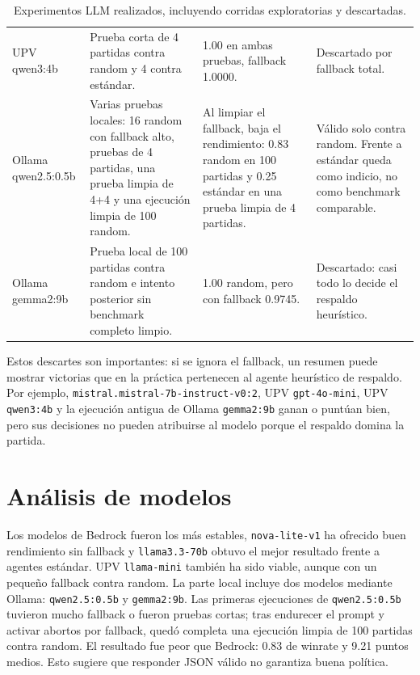 ﻿\documentclass[10pt,a4paper]{article}
\begin{document}
\begin{table}[H]
\begin{tabular}{L{2.7cm}L{4.3cm}L{4.6cm}L{4.4cm}}
\addlinespace[0.25em]
UPV qwen3:4b & Prueba corta de 4 partidas contra random y 4 contra estándar. & 1.00 en ambas pruebas, fallback 1.0000. & Descartado por fallback total. \\
\addlinespace[0.25em]
Ollama qwen2.5:0.5b & Varias pruebas locales: 16 random con fallback alto, pruebas de 4 partidas, una prueba limpia de 4+4 y una ejecución limpia de 100 random. & Al limpiar el fallback, baja el rendimiento: 0.83 random en 100 partidas y 0.25 estándar en una prueba limpia de 4 partidas. & Válido solo contra random. Frente a estándar queda como indicio, no como benchmark comparable. \\
\addlinespace[0.25em]
Ollama gemma2:9b & Prueba local de 100 partidas contra random e intento posterior sin benchmark completo limpio. & 1.00 random, pero con fallback 0.9745. & Descartado: casi todo lo decide el respaldo heurístico. \\
\bottomrule
\end{tabular}
\caption{Experimentos LLM realizados, incluyendo corridas exploratorias y descartadas.}
\label{tab:llm_all}
\end{table}

Estos descartes son importantes: si se ignora el fallback, un resumen puede mostrar victorias que en la práctica pertenecen al agente heurístico de respaldo. Por ejemplo, \texttt{mistral.mistral-7b-instruct-v0:2}, UPV \texttt{gpt-4o-mini}, UPV \texttt{qwen3:4b} y la ejecución antigua de Ollama \texttt{gemma2:9b} ganan o puntúan bien, pero sus decisiones no pueden atribuirse al modelo porque el respaldo domina la partida.

\section{Análisis de modelos}
Los modelos de Bedrock fueron los más estables, \texttt{nova-lite-v1} ha ofrecido buen rendimiento sin fallback y \texttt{llama3.3-70b} obtuvo el mejor resultado frente a agentes estándar. UPV \texttt{llama-mini} también ha sido viable, aunque con un pequeño fallback contra random. La parte local incluye dos modelos mediante Ollama: \texttt{qwen2.5:0.5b} y \texttt{gemma2:9b}. Las primeras ejecuciones de \texttt{qwen2.5:0.5b} tuvieron mucho fallback o fueron pruebas cortas; tras endurecer el prompt y activar abortos por fallback, quedó completa una ejecución limpia de 100 partidas contra random. El resultado fue peor que Bedrock: 0.83 de winrate y 9.21 puntos medios. Esto sugiere que responder JSON válido no garantiza buena política.
\end{document}
